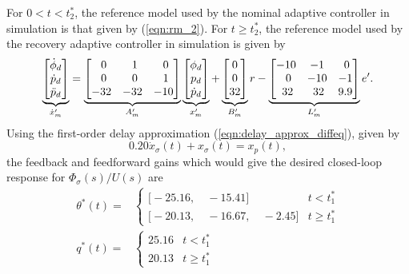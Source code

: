 For $0 < t < t_2^*$, the reference model used by the nominal adaptive controller in simulation is that given by (\ref{eqn:rm_2}). For $t \geq t_2^*$, the reference model used by the recovery adaptive controller in simulation is given by
\begin{equation}
	\underbrace{\begin{bmatrix}
		\dot{\phi}_d \\ \dot{p}_d \\ \ddot{p}_d
	\end{bmatrix}}_{\dot{x}_m'} = \underbrace{\begin{bmatrix}
		\hfil 0 & \hfil 1 & \hfil 0\\ \hfil 0 & \hfil 0 & \hfil 1 \\ -32 & -32 & -10
	\end{bmatrix}}_{A_m'} \underbrace{\begin{bmatrix}
		\phi_d \\ p_d \\ \dot{p}_d
	\end{bmatrix}}_{x_m'} + \underbrace{\begin{bmatrix}
		0 \\ 0 \\ 32
	\end{bmatrix}}_{B_m'} r - \underbrace{\begin{bmatrix}
		-10 & -1 & \hfil 0 \\ \hfil 0 & \hfil -10 & \hfil -1 \\ \hfil 32 & \hfil 32 & \hfil 9.9
	\end{bmatrix}}_{L_m'} e'.
	\label{eqn:rm_3_delay}
\end{equation}
Using the first-order delay approximation (\ref{eqn:delay_approx_diffeq}), given by
\begin{equation}
	0.20 \dot{x}_{\sigma}(t) + x_{\sigma}(t) = x_p(t),
\end{equation}
the feedback and feedforward gains which would give the desired closed-loop response for $\Phi_\sigma(s)/U(s)$ are
\begin{align}
	\theta^*(t) = & \begin{cases} \Big[-25.16, \quad -15.41 \Big] & t < t_1^* \\ 
	\Big[-20.13, \quad -16.67, \quad -2.45 \Big] & t \geq t_1^* \end{cases} \\
	q^*(t) = &\begin{cases} 25.16 & t < t_1^* \\ 20.13 & t \geq t_1^* \end{cases}
\end{align}

